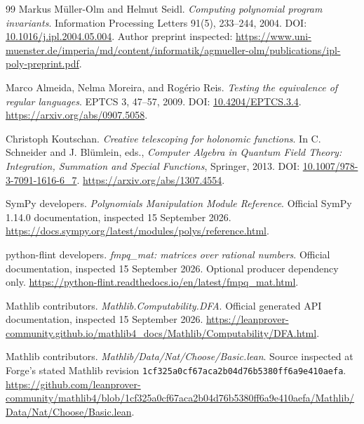 \begin{thebibliography}{99}
Markus M\"uller-Olm and Helmut Seidl. \emph{Computing polynomial program invariants}.
Information Processing Letters 91(5), 233--244, 2004.
DOI: \href{https://doi.org/10.1016/j.ipl.2004.05.004}{10.1016/j.ipl.2004.05.004}.
Author preprint inspected:
\url{https://www.uni-muenster.de/imperia/md/content/informatik/agmueller-olm/publications/ipl-poly-preprint.pdf}.

Marco Almeida, Nelma Moreira, and Rog\'erio Reis.
\emph{Testing the equivalence of regular languages}.
EPTCS 3, 47--57, 2009.
DOI: \href{https://doi.org/10.4204/EPTCS.3.4}{10.4204/EPTCS.3.4}.
\url{https://arxiv.org/abs/0907.5058}.

Christoph Koutschan. \emph{Creative telescoping for holonomic functions}.
In C. Schneider and J. Bl\"umlein, eds., \emph{Computer Algebra in Quantum Field Theory:
Integration, Summation and Special Functions}, Springer, 2013.
DOI: \href{https://doi.org/10.1007/978-3-7091-1616-6_7}{10.1007/978-3-7091-1616-6\_7}.
\url{https://arxiv.org/abs/1307.4554}.

SymPy developers. \emph{Polynomials Manipulation Module Reference}.
Official SymPy 1.14.0 documentation, inspected 15 September 2026.
\url{https://docs.sympy.org/latest/modules/polys/reference.html}.

python-flint developers. \emph{fmpq\_mat: matrices over rational numbers}.
Official documentation, inspected 15 September 2026. Optional producer dependency only.
\url{https://python-flint.readthedocs.io/en/latest/fmpq_mat.html}.

Mathlib contributors. \emph{Mathlib.Computability.DFA}.
Official generated API documentation, inspected 15 September 2026.
\url{https://leanprover-community.github.io/mathlib4_docs/Mathlib/Computability/DFA.html}.

Mathlib contributors. \emph{Mathlib/Data/Nat/Choose/Basic.lean}.
Source inspected at Forge's stated Mathlib revision
\texttt{1cf325a0cf67aca2b04d76b5380ff6a9e410aefa}.
\url{https://github.com/leanprover-community/mathlib4/blob/1cf325a0cf67aca2b04d76b5380ff6a9e410aefa/Mathlib/Data/Nat/Choose/Basic.lean}.
\end{thebibliography}

